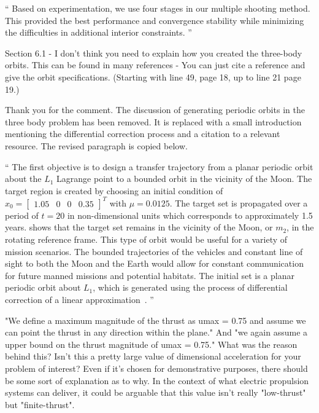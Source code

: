 \documentclass[11pt]{article}
\newenvironment{correction}{\begin{list}{}{\setlength{\leftmargin}{1cm}\setlength{\rightmargin}{1cm}}\vspace{\parsep}\item[]``}{''\end{list}}
\begin{document}
\begin{enumerate}
\begin{correction}
Based on experimentation, we use four stages in our multiple shooting method.
This provided the best performance and convergence stability while minimizing the difficulties in additional interior constraints.
\end{correction}


\item 
    \begin{itshape}
Section 6.1 - I don't think you need to explain how you created the three-body orbits.  This can be found in many references - You can just cite a reference and give the orbit specifications.  (Starting with line 49, page 18, up to line 21 page 19.)
\end{itshape}

Thank you for the comment.
The discussion of generating periodic orbits in the three body problem has been removed.
It is replaced with a small introduction mentioning the differential correction process and a citation to a relevant resource. 
The revised paragraph is copied below.

\begin{correction}
The first objective is to design a transfer trajectory from a planar periodic orbit about the \( L_1\) Lagrange point to a bounded orbit in the vicinity of the Moon.
The target region is created by choosing an initial condition of \( x_0 = \begin{bmatrix}1.05 & 0 & 0 & 0.35 \end{bmatrix}^T \) with \( \mu = 0.0125 \).
The target set is propagated over a period of \( t = \num{20} \) in non-dimensional units which corresponds to approximately \num{1.5} years.
 shows that the target set remains in the vicinity of the Moon, or \( m_2\), in the rotating reference frame. 
This type of orbit would be useful for a variety of mission scenarios.
The bounded trajectories of the vehicles and constant line of sight to both the Moon and the Earth would allow for constant communication for future manned missions and potential habitats.
The initial set is a planar periodic orbit about \( L_1\), which is generated using the process of differential correction of a linear approximation~\cite{koon2011}.
\end{correction}

\item
    \begin{itshape}
"We define a maximum magnitude of the thrust as umax = 0.75 and assume we can point the thrust in any direction within the plane." And  "we again assume a upper bound on the thrust magnitude of umax = 0.75."  What was the reason behind this? Isn't this a pretty large value of dimensional acceleration for your problem of interest?  Even if it's chosen for demonstrative purposes, there should be some sort of explanation as to why.  In the context of what electric propulsion systems can deliver, it could be arguable that this value isn't really "low-thrust" but "finite-thrust".
\end{itshape}


\end{enumerate}
\end{document}
